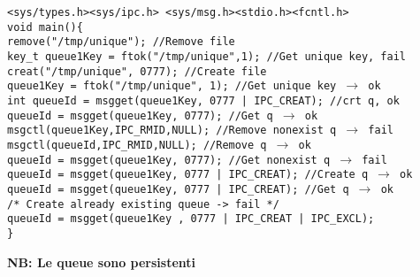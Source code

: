 \begin{flushleft}
\begin{flushleft}
    \texttt{<sys/types.h><sys/ipc.h> <sys/msg.h><stdio.h><fcntl.h>\\
    void main()\{\\
    \halftab remove("/tmp/unique"); //Remove file\\
    \halftab key\_t queue1Key = ftok("/tmp/unique",1); //Get unique key, fail\\
    \halftab creat("/tmp/unique", 0777); //Create file\\
    \halftab queue1Key = ftok("/tmp/unique", 1); //Get unique key $\rightarrow$ ok\\
    \halftab int queueId = msgget(queue1Key, 0777 | IPC\_CREAT); //crt q, ok\\
    \halftab queueId = msgget(queue1Key, 0777); //Get q $\rightarrow$ ok\\
    \halftab msgctl(queue1Key,IPC\_RMID,NULL); //Remove nonexist q $\rightarrow$ fail\\
    \halftab msgctl(queueId,IPC\_RMID,NULL); //Remove q $\rightarrow$ ok\\
    \halftab queueId = msgget(queue1Key, 0777); //Get nonexist q $\rightarrow$ fail\\
    \halftab queueId = msgget(queue1Key, 0777 | IPC\_CREAT); //Create q $\rightarrow$ ok\\
    \halftab queueId = msgget(queue1Key, 0777 | IPC\_CREAT); //Get q $\rightarrow$ ok\\
    \halftab /* Create already existing queue -> fail */\\
    \halftab queueId = msgget(queue1Key , 0777 | IPC\_CREAT | IPC\_EXCL); \\
    \}
    }
  \end{flushleft}
  \textbf{NB: Le queue sono persistenti}

\end{flushleft}
